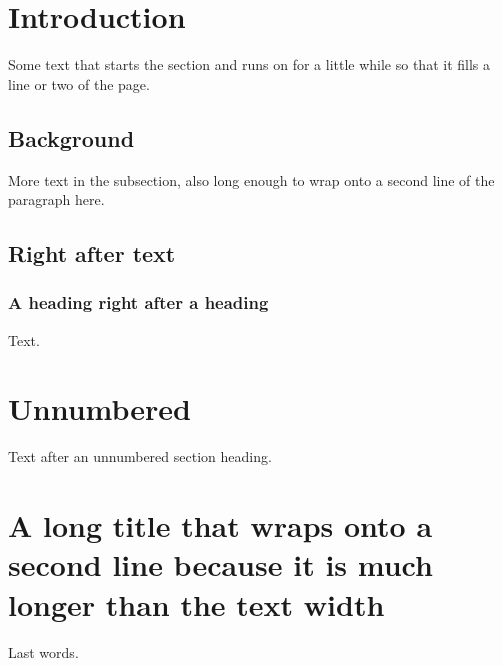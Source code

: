 \documentclass{article}
\begin{document}
\section{Introduction}
Some text that starts the section and runs on for a little while so that it fills a line or two of the page.

\subsection{Background}
More text in the subsection, also long enough to wrap onto a second line of the paragraph here.
\subsection{Right after text}
\subsubsection{A heading right after a heading}
Text.
\section*{Unnumbered}
Text after an unnumbered section heading.
\section{A long title that wraps onto a second line because it is much longer than the text width}
Last words.
\end{document}
